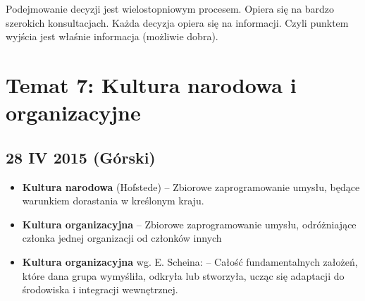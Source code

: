 \documentclass[a4paper,10pt]{report}
\begin{document}
Podejmowanie decyzji jest wielostopniowym procesem. Opiera się na bardzo szerokich konsultacjach. Każda decyzja opiera się na informacji. Czyli punktem wyjścia jest właśnie informacja (możliwie dobra).

\chapter{Temat 7: Kultura narodowa i organizacyjne}

\section{28 IV 2015 (Górski)}

\begin{itemize}
	\item \textbf{Kultura narodowa} (Hofstede) --
		Zbiorowe zaprogramowanie umysłu, będące warunkiem dorastania w kreślonym kraju. 
	\item \textbf{Kultura organizacyjna} --
		Zbiorowe zaprogramowanie umysłu, odróżniające członka jednej organizacji od członków innych
	\item \textbf{Kultura organizacyjna} wg. E. Scheina: --
		Całość fundamentalnych założeń, które dana grupa wymyśliła, odkryła lub stworzyła, ucząc się adaptacji do środowiska i integracji wewnętrznej.
\end{itemize}
\end{document}
